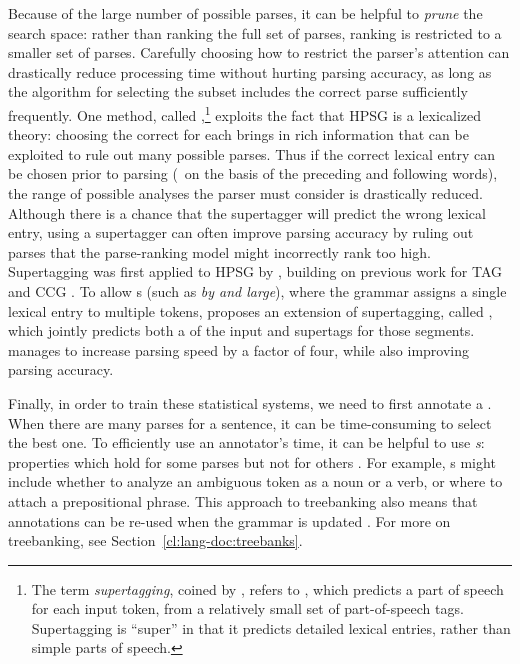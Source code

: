 \documentclass[output=paper
	        ,collection
	        ,collectionchapter
 	        ,biblatex
                ,babelshorthands
                ,newtxmath
                ,draftmode
                ,colorlinks, citecolor=brown
]{langscibook}
\begin{document}
Because of the large number of possible parses,
it can be helpful to \textit{prune} the search space:
rather than ranking the full set of parses,
ranking is restricted to a smaller set of parses.
Carefully choosing how to restrict the parser's attention 
can drastically reduce processing time without hurting parsing accuracy,
as long as the algorithm for selecting the subset
includes the correct parse sufficiently frequently.
One method, called \textit{},\footnote{%
	The term \textit{supertagging}, coined by \citet{bangalore1999supertag},
	refers to \textit{},
	which predicts a part of speech for each input token,
	from a relatively small set of part-of-speech tags.
	Supertagging is ``super'' in that it predicts detailed lexical entries,
	rather than simple parts of speech.
}
exploits the fact that HPSG is a lexicalized theory:
choosing the correct  for each  brings in rich information
that can be exploited to rule out many possible parses.
Thus if the correct lexical entry can be chosen prior to parsing
(\eg\ on the basis of the preceding and following words),
the range of possible analyses the parser must consider is drastically reduced.
Although there is a chance that the supertagger will predict the wrong lexical entry,
using a supertagger can often improve parsing accuracy
by ruling out parses that the parse-ranking model might incorrectly rank too high.
Supertagging was first applied to HPSG by \citet{matsuzaki2007supertag},
building on previous work for TAG \citep{bangalore1999supertag}
and CCG \citep{clark2004supertag}.
To allow s (such as \textit{by and large}),
where the grammar assigns a single lexical entry to multiple tokens,
\citet{dridan2013ubertag} proposes an extension of supertagging, called \textit{},
which jointly predicts both a  of the input and supertags for those segments.
\citeauthor{dridan2013ubertag} manages to increase parsing speed by a factor of four,
while also improving parsing accuracy.


Finally, in order to train these statistical systems,
we need to first annotate a .
When there are many parses for a sentence,
it can be time-consuming to select the best one.
To efficiently use an annotator's time,
it can be helpful to use \textit{s}:
properties which hold for some parses but not for others \citep{Carter:97}.
For example, s might include
whether to analyze an ambiguous token as a noun or a verb,
or where to attach a prepositional phrase.
This approach to treebanking also means that
annotations can be re-used when the grammar is updated
\citep{OFTM2004a-u,Fli:Oep:Ben:17}.
For more on treebanking, see Section~\ref{cl:lang-doc:treebanks}.%
\end{document}
